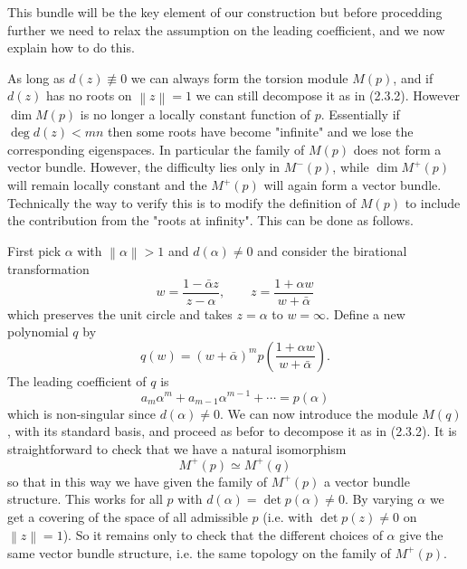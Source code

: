 \documentclass[leqno]{book}
\numberwithin{equation}{section}
\theoremstyle{definition}
\begin{document}
            This bundle will be the key element of our construction but before procedding further we need to relax the assumption on the leading coefficient, and we now explain how to do this.

            As long as $d(z)\not\equiv 0$ we can always form the torsion module $M(p)$, and if $d(z)$ has no roots on $\left\| z \right\|=1$ we can still decompose it as in (2.3.2). However $\operatorname{dim}M(p)$ is no longer a locally constant function of $p$. Essentially if $\operatorname{deg}d(z)<mn$ then some roots have become "infinite" and we lose the corresponding eigenspaces. In particular the family of $M(p)$ does not form a vector bundle. However, the difficulty lies only in $M^{-}(p)$, while $\operatorname{dim}M^{+}(p)$ will remain locally constant and the $M^{+}(p)$ will again form a vector bundle. Technically the way to verify this is to modify the definition of $M(p)$ to include the contribution from the "roots at infinity". This can be done as follows.

            First pick $\alpha$ with $\left\| \alpha \right\|>1$ and $d(\alpha)\neq 0$ and consider the birational transformation
            \begin{equation*}
              \tag{2.3.3}
              w=\frac{1-\bar{\alpha}z}{z-\alpha},\qquad z=\frac{1+\alpha w}{w+\bar{\alpha}}
            \end{equation*}
            which preserves the unit circle and takes $z=\alpha$ to $w=\infty$. Define a new polynomial $q$ by
            \begin{equation*}
              \tag{2.3.4}
              q(w)=(w+\bar{\alpha})^{m}p(\frac{1+\alpha w}{w+\bar{\alpha}}).
            \end{equation*}
            The leading coefficient of $q$ is 
            \begin{equation*}
              a_{m}\alpha^{m}+a_{m-1}\alpha^{m-1}+ \cdots =p(\alpha)
            \end{equation*}
            which is non-singular since $d(\alpha)\neq 0$. We can now introduce the module $M(q)$, with its standard basis, and proceed as befor to decompose it as in (2.3.2). It is straightforward to check that we have a natural isomorphism
            \begin{equation*}
              M^{+}(p)\simeq M^{+}(q)
            \end{equation*}
            so that in this way we have given the family of $M^{+}(p)$ a vector bundle structure. This works for all $p$ with $d(\alpha)=\det p(\alpha)\neq 0$. By varying $\alpha$ we get a covering of the space of all admissible $p$ (i.e. with $\det p(z)\neq 0$ on $\left\| z \right\|=1$). So it remains only to check that the different choices of $\alpha$ give the same vector bundle structure, i.e. the same topology on the family of $M^{+}(p)$.
\end{document}
